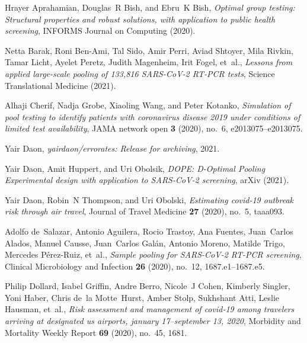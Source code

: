 \documentclass{article}
\begin{document}

\providecommand{\bysame}{\leavevmode\hbox to3em{\hrulefill}\thinspace}
\providecommand{\MR}{\relax\ifhmode\unskip\space\fi MR }
\providecommand{\MRhref}[2]{%
  \href{http://www.ams.org/mathscinet-getitem?mr=#1}{#2}
}
\providecommand{\href}[2]{#2}
\begin{thebibliography}{10}

Hrayer Aprahamian, Douglas~R Bish, and Ebru~K Bish, \emph{Optimal group
  testing: Structural properties and robust solutions, with application to
  public health screening}, INFORMS Journal on Computing (2020).

Netta Barak, Roni Ben-Ami, Tal Sido, Amir Perri, Aviad Shtoyer, Mila Rivkin,
  Tamar Licht, Ayelet Peretz, Judith Magenheim, Irit Fogel, et~al.,
  \emph{Lessons from applied large-scale pooling of 133,816 {SARS-CoV}-2
  {RT-PCR} tests}, Science Translational Medicine (2021).

Alhaji Cherif, Nadja Grobe, Xiaoling Wang, and Peter Kotanko, \emph{Simulation
  of pool testing to identify patients with coronavirus disease 2019 under
  conditions of limited test availability}, JAMA network open \textbf{3}
  (2020), no.~6, e2013075--e2013075.

Yair Daon, \emph{yairdaon/errorates: Release for archiving}, 2021.

Yair Daon, Amit Huppert, and Uri Obolsik, \emph{{DOPE}: {D}-{O}ptimal {P}ooling
  {E}xperimental design with application to {SARS-CoV}-2 screening}, {arXiv}
  (2021).

Yair Daon, Robin~N Thompson, and Uri Obolski, \emph{Estimating covid-19
  outbreak risk through air travel}, Journal of Travel Medicine \textbf{27}
  (2020), no.~5, taaa093.

Adolfo de~Salazar, Antonio Aguilera, Rocio Trastoy, Ana Fuentes, Juan~Carlos
  Alados, Manuel Causse, Juan~Carlos Gal{\'a}n, Antonio Moreno, Matilde Trigo,
  Mercedes P{\'e}rez-Ruiz, et~al., \emph{Sample pooling for {SARS-CoV-2 RT-PCR}
  screening}, Clinical Microbiology and Infection \textbf{26} (2020), no.~12,
  1687.e1--1687.e5.

Philip Dollard, Isabel Griffin, Andre Berro, Nicole~J Cohen, Kimberly Singler,
  Yoni Haber, Chris de~la Motte~Hurst, Amber Stolp, Sukhshant Atti, Leslie
  Hausman, et~al., \emph{Risk assessment and management of covid-19 among
  travelers arriving at designated us airports, january 17--september 13,
  2020}, Morbidity and Mortality Weekly Report \textbf{69} (2020), no.~45,
  1681.


\end{thebibliography}
\end{document}
